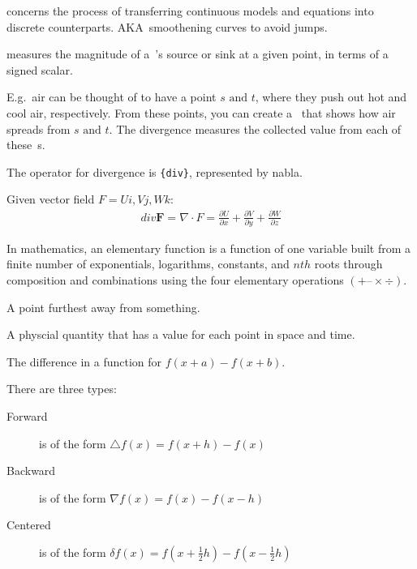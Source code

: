 \begin{definition}[Discretization]
    concerns the process of transferring
    continuous models and equations into discrete counterparts. 
    AKA\ smoothening curves to avoid jumps.

\end{definition}

\begin{definition}[Divergence]\label{divergence}
    measures the magnitude of a~'s source or sink at a
    given point, in terms of a signed scalar.

    E.g.\ air can be thought of to have a point $s \text{ and } t$, where they
    push out hot and cool air, respectively. From these points, you can create
    a~ that shows how air spreads from $s \text{ and }
    t$. The divergence measures the collected value from each of 
    these~s.

    The operator for divergence is \verb|{div}|, represented by nabla.

    Given vector field $F = Ui, Vj, Wk$:
    \begin{align}
            div \textbf{F} = \nabla \cdot F = 
            \frac{\partial{U}}{\partial{x}}+
            \frac{\partial{V}}{\partial{y}} +
            \frac{\partial{W}}{\partial{z}}
    \end{align}

\end{definition}

\begin{definition}
    In mathematics, an elementary function is a function of one variable built
    from a finite number of exponentials, logarithms, constants, and $nth$ roots
    through composition and combinations using the four elementary operations
    $(+ – × ÷)$.

\end{definition}

\begin{definition}
    A point furthest away from something.
\end{definition}

\begin{definition}[Field]
    A physcial quantity that has a value for each point in space and time.
\end{definition}

\begin{definition}
    The difference in a function for $f(x + a) - f(x + b)$.

    There are three types:
    \begin{description}
        \item[Forward] is of the form $\bigtriangleup{f}(x) = f(x + h) - f(x)$
        \item[Backward] is of the form $\nabla{f}(x) = f(x) - f(x - h)$
        \item[Centered] is of the form $\delta{f}(x) = f(x + \frac{1}{2}h) - f(x - \frac{1}{2}h)$
    \end{description}
\end{definition}

